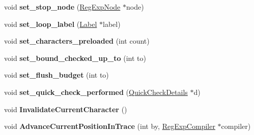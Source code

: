 \begin{DoxyCompactItemize}
\item 
void {\bfseries set\+\_\+stop\+\_\+node} (\hyperlink{classv8_1_1internal_1_1_reg_exp_node}{Reg\+Exp\+Node} $\ast$node)\hypertarget{classv8_1_1internal_1_1_trace_a15c4f73f8c67ffe1cc89022e77f0f08d}{}\label{classv8_1_1internal_1_1_trace_a15c4f73f8c67ffe1cc89022e77f0f08d}

\item 
void {\bfseries set\+\_\+loop\+\_\+label} (\hyperlink{classv8_1_1internal_1_1_label}{Label} $\ast$label)\hypertarget{classv8_1_1internal_1_1_trace_af1892d71317fec9d1572d586eaaa650a}{}\label{classv8_1_1internal_1_1_trace_af1892d71317fec9d1572d586eaaa650a}

\item 
void {\bfseries set\+\_\+characters\+\_\+preloaded} (int count)\hypertarget{classv8_1_1internal_1_1_trace_a814b56c3489e65d99c19444307d92b4b}{}\label{classv8_1_1internal_1_1_trace_a814b56c3489e65d99c19444307d92b4b}

\item 
void {\bfseries set\+\_\+bound\+\_\+checked\+\_\+up\+\_\+to} (int to)\hypertarget{classv8_1_1internal_1_1_trace_acc47ada5b60091d4cffa56843d1caa19}{}\label{classv8_1_1internal_1_1_trace_acc47ada5b60091d4cffa56843d1caa19}

\item 
void {\bfseries set\+\_\+flush\+\_\+budget} (int to)\hypertarget{classv8_1_1internal_1_1_trace_af3db12d8d1de2cab0a28f4138e6e6c9d}{}\label{classv8_1_1internal_1_1_trace_af3db12d8d1de2cab0a28f4138e6e6c9d}

\item 
void {\bfseries set\+\_\+quick\+\_\+check\+\_\+performed} (\hyperlink{classv8_1_1internal_1_1_quick_check_details}{Quick\+Check\+Details} $\ast$d)\hypertarget{classv8_1_1internal_1_1_trace_a9eb035553c6ae5b4998acdb6544b7976}{}\label{classv8_1_1internal_1_1_trace_a9eb035553c6ae5b4998acdb6544b7976}

\item 
void {\bfseries Invalidate\+Current\+Character} ()\hypertarget{classv8_1_1internal_1_1_trace_afb21dd6aad6cd15722fdadf6fd58554a}{}\label{classv8_1_1internal_1_1_trace_afb21dd6aad6cd15722fdadf6fd58554a}

\item 
void {\bfseries Advance\+Current\+Position\+In\+Trace} (int by, \hyperlink{classv8_1_1internal_1_1_reg_exp_compiler}{Reg\+Exp\+Compiler} $\ast$compiler)\hypertarget{classv8_1_1internal_1_1_trace_a7e078348b42259aaaa38bc2a2f90d2ab}{}\label{classv8_1_1internal_1_1_trace_a7e078348b42259aaaa38bc2a2f90d2ab}

\end{DoxyCompactItemize}
